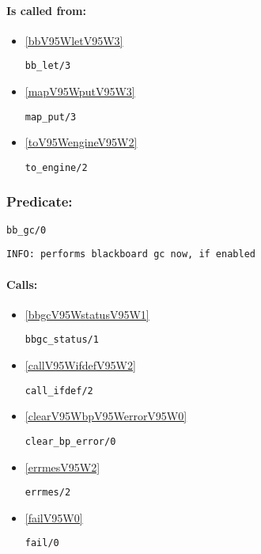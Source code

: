 \paragraph{Is called from:} 
\begin{itemize}
\item \ref{bbV95WletV95W3} 
\begin{verbatim}
bb_let/3
\end{verbatim}

\item \ref{mapV95WputV95W3} 
\begin{verbatim}
map_put/3
\end{verbatim}

\item \ref{toV95WengineV95W2} 
\begin{verbatim}
to_engine/2
\end{verbatim}

\end{itemize}

\subsubsection{Predicate:} \label{bbV95WgcV95W0}

\begin{verbatim}
bb_gc/0
\end{verbatim}

{\small \begin{verbatim}
INFO: performs blackboard gc now, if enabled

\end{verbatim}}
\paragraph{Calls:} 
\begin{itemize}
\item \ref{bbgcV95WstatusV95W1} 
\begin{verbatim}
bbgc_status/1
\end{verbatim}

\item \ref{callV95WifdefV95W2} 
\begin{verbatim}
call_ifdef/2
\end{verbatim}

\item \ref{clearV95WbpV95WerrorV95W0} 
\begin{verbatim}
clear_bp_error/0
\end{verbatim}

\item \ref{errmesV95W2} 
\begin{verbatim}
errmes/2
\end{verbatim}

\item \ref{failV95W0} 
\begin{verbatim}
fail/0
\end{verbatim}

\end{itemize}
